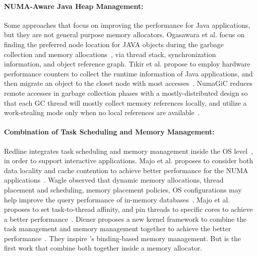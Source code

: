 \paragraph{NUMA-Aware Java Heap Management:} Some approaches that focus on improving the performance for Java applications, but they are not general purpose memory allocators. Ogasawara et al. focus on finding the preferred node location for JAVA objects during the garbage collection and memory allocations~\cite{Ogasawara:2009:NMM:1640089.1640117}, via thread stack, synchronization information, and object reference graph. Tikir et al. propose to employ hardware performance counters to collect the runtime information of Java applications, and then migrate an object to the closet node with most accesses~\cite{1419934}. 
NumaGiC reduces remote accesses in garbage collection phases with a mostly-distributed design so that each GC thread will mostly collect memory references locally, and utilize a work-stealing mode only when no local references are available~\cite{NumaGiC}.


\paragraph{Combination of Task Scheduling and Memory Management:} Redline integrates task scheduling and memory management inside the OS level~\cite{Redline}, in order to support  interactive applications. 
Majo et al. proposes to consider both data locality and cache contention to achieve better performance for the NUMA applications~\cite{Majo:2011:MMN:1993478.1993481}. Wagle observed that dynamic memory allocations, thread placement and scheduling, memory placement policies, OS configurations may help improve the query performance of in-memory databases~\cite{wagle2015numa}.  Majo et al. proposes to set task-to-thread affinity, and pin threads to specific cores to achieve a better performance~\cite{Majo:2015:LPC:2688500.2688509}. Diener proposes a new kernel framework to combine the task management and memory management together to achieve the better performance~\cite{diener2015automatic}.
They inspire \NM{}'s binding-based memory management. But \NM{} is the first work that combine both together inside a memory allocator. 



